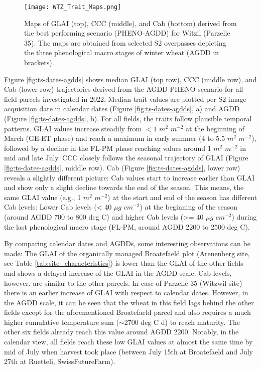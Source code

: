 \begin{figure}[H]
    \centering
    \texttt{[image: WTZ\_Trait\_Maps.png]}
    \caption[Maps of GLAI (top), CCC (middle), and Cab (bottom) derived from the best performing scenario (PHENO-AGDD) for Witzil (Parzelle 35). The maps are obtained from selected S2 overpasses depicting the three phenological macro stages of winter wheat (AGDD in brackets).]{Maps of GLAI (top), CCC (middle), and Cab (bottom) derived from the best performing scenario (PHENO-AGDD) for Witzil (Parzelle 35). The maps are obtained from selected S2 overpasses depicting the three phenological macro stages of winter wheat (AGDD in brackets).}
    \label{fig:trait-maps-wtz}
\end{figure}

Figure \ref{fig:ts-dates-agdds} shows median GLAI (top row), CCC (middle row), and Cab (lower row) trajectories derived from the AGDD-PHENO scenario for all field parcels investigated in 2022. Median trait values are plotted per S2 image acquisition date in calendar dates (Figure \ref{fig:ts-dates-agdds}, a) and AGDD (Figure \ref{fig:ts-dates-agdds}, b). For all fields, the traits follow plausible temporal patterns. GLAI values increase steadily from $<1$ $m^2$ $m^{-2}$ at the beginning of March (GE-ET phase) and reach a maximum in early summer (4 to 5.5 $m^2$ $m^{-2}$), followed by a decline in the FL-PM phase reaching values around 1 $m^2$ $m^{-2}$ in mid and late July. CCC closely follows the seasonal trajectory of GLAI (Figure \ref{fig:ts-dates-agdds}, middle row). Cab (Figure \ref{fig:ts-dates-agdds}, lower row) reveals a slightly different picture: Cab values start to increase earlier than GLAI and show only a slight decline towards the end of the season. This means, the same GLAI value (e.g., 1 $m^2$ $m^{-2}$) at the start and end of the season has different Cab levels: Lower Cab levels (< 40 $\mu g$ $cm^{-2}$) at the beginning of the season (around AGDD 700 to 800 deg C)  and higher Cab levels (>= 40 $\mu g$ $cm^{-2}$) during the last phenological macro stage (FL-PM, around AGDD 2200 to 2500 deg C).

By comparing calendar dates and AGDDs, some interesting observations can be made: The GLAI of the organically managed Broatefaeld plot (Arenenberg site, see Table \ref{tab:site_characteristics}) is lower than the GLAI of the other fields and shows a delayed increase of the GLAI in the AGDD scale. Cab levels, however, are similar to the other parcels. In case of Parzelle 35 (Witzwil site) there is an earlier increase of GLAI with respect to calendar dates. However, in the AGDD scale, it can be seen that the wheat in this field lags behind the other fields except for the aforementioned Broatefaeld parcel and also requires a much higher cumulative temperature sum ($\sim$2700 deg C d) to reach maturity. The other six fields already reach this value around AGDD 2200. Notably, in the calendar view, all fields reach these low GLAI values at almost the same time by mid of July when harvest took place (between July 15th at Broatefaeld and July 27th at Ruetteli, SwissFutureFarm).

